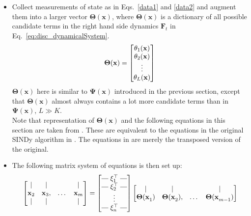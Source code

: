 \begin{itemize}
    \item Collect measurements of state as in Eqs.~\ref{data1} and \ref{data2} and augment them into a larger vector $\mathbf{\Theta(x)}$, where $\mathbf{\Theta(x)}$ is a dictionary of all possible candidate terms in the right hand side dynamics $\mathbf{F}_t$ in Eq.~\ref{eq:disc_dynamicalSystem}.
    \begin{equation}
    \label{eq:theta_sym}
        \mathbf{\Theta({x})} = \begin{bmatrix}
         \theta_1\mathbf{(x)}\\ \theta_2\mathbf{(x)} \\ \rowsvdots \\ \theta_L\mathbf{(x)}\\
        \end{bmatrix}
    \end{equation}
    $\mathbf{\Theta(x)}$ here is similar to $\mathbf{\Psi(x)}$ introduced in the previous section, except that $\mathbf{\Theta(x)}$ almost always contains a lot more candidate terms than in $\mathbf{\Psi(x)}$, $L \gg K$. \\
    Note that representation of $\mathbf{\Theta({x})}$ and the following equations in this section are taken from \cite{Brunton_K_invariant_sub}. These are equivalent to the equations in the original SINDy algorithm in \cite{SINDy}. The equations in \cite{Brunton_K_invariant_sub} are merely the transposed version of the original.
    \item The following matrix system of equations is then set up:
    \begin{equation}
    \label{eq:SINDy1}
        \begin{bmatrix}
        |                &  |               &    \quad&         |         \\
        \mathbf{x}_{2}   &  \mathbf{x}_{3}, &   \dots & \mathbf{x}_{m} \\
        |                &  |               &    \quad&         |       
        \end{bmatrix} = \brows{\mathbf{\xi}_1^\top \\ \mathbf{\xi}_2^\top \\ \rowsvdots \\ \mathbf{\xi}_n^\top}
        \begin{bmatrix}
         |                &  |               &    \quad&         |         \\
        \mathbf{\Theta(x}_{1})   &  \mathbf{\Theta(x}_{2}), &   \dots & \mathbf{\Theta(x}_{m-1}) \\

\end{bmatrix}
\end{equation}
\end{itemize}
